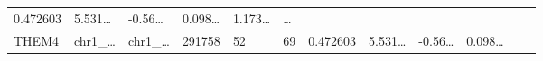 \documentclass[
]{article}
\begin{document}
\begin{longtable}[]{@{}llllllllllll@{}}
\begin{minipage}[t]{0.06\columnwidth}
0.472603\strut
\end{minipage} & \begin{minipage}[t]{0.08\columnwidth}\raggedright
5.531\ldots{}\strut
\end{minipage} & \begin{minipage}[t]{0.06\columnwidth}\raggedright
-0.56\ldots{}\strut
\end{minipage} & \begin{minipage}[t]{0.06\columnwidth}\raggedright
0.098\ldots{}\strut
\end{minipage} & \begin{minipage}[t]{0.09\columnwidth}\raggedright
1.173\ldots{}\strut
\end{minipage} & \begin{minipage}[t]{0.02\columnwidth}\raggedright
\ldots{}\strut
\end{minipage}\tabularnewline
\begin{minipage}[t]{0.06\columnwidth}\raggedright
THEM4\strut
\end{minipage} & \begin{minipage}[t]{0.06\columnwidth}\raggedright
chr1\_\ldots{}\strut
\end{minipage} & \begin{minipage}[t]{0.06\columnwidth}\raggedright
chr1\_\ldots{}\strut
\end{minipage} & \begin{minipage}[t]{0.06\columnwidth}\raggedright
291758\strut
\end{minipage} & \begin{minipage}[t]{0.06\columnwidth}\raggedright
52\strut
\end{minipage} & \begin{minipage}[t]{0.06\columnwidth}\raggedright
69\strut
\end{minipage} & \begin{minipage}[t]{0.06\columnwidth}\raggedright
0.472603\strut
\end{minipage} & \begin{minipage}[t]{0.08\columnwidth}\raggedright
5.531\ldots{}\strut
\end{minipage} & \begin{minipage}[t]{0.06\columnwidth}\raggedright
-0.56\ldots{}\strut
\end{minipage} & \begin{minipage}[t]{0.06\columnwidth}\raggedright
0.098\ldots{}\strut
\end{minipage} & \begin{minipage}[t]{0.09\columnwidth}\raggedright

\end{minipage}
\end{longtable}
\end{document}
